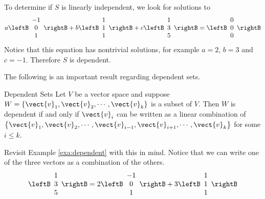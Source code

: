 \begin{solution}
To determine if $S$ is linearly independent, we look for solutions to
\[ 
a\leftB\begin{array}{c} -1 \\ 0 \\ 1 \end{array}\rightB
+b\leftB\begin{array}{c} 1 \\ 1 \\ 1 \end{array}\rightB
+c\leftB\begin{array}{c} 1 \\ 3 \\ 5 \end{array}\rightB
=\leftB\begin{array}{c} 0 \\ 0 \\ 0 \end{array}\rightB
\]
Notice that this equation has nontrivial solutions, 
for example $a=2$, $b=3$ and $c=-1$. Therefore $S$ is dependent. 
\end{solution}

The following is an important result regarding dependent sets.

\begin{lemma}{Dependent Sets}\label{lem:dependent}
Let $V$ be a vector space and suppose $W = \left\{ \vect{v}_1, \vect{v}_2, \cdots, \vect{v}_k \right\}$ is a subset of $V$. Then $W$ is dependent if and only if $\vect{v}_i$ can be written as a linear combination of $\left\{ \vect{v}_1, \vect{v}_2, \cdots, \vect{v}_{i-1}, \vect{v}_{i+1}, \cdots,  \vect{v}_k \right\}$ for some $i \leq k$. 
\end{lemma}

Revisit Example \ref{exa:dependent} with this in mind. Notice that we can write one of the three vectors as a combination of the others.
\[
\leftB\begin{array}{c} 1 \\ 3 \\ 5 \end{array}\rightB
=
2\leftB\begin{array}{c} -1 \\ 0 \\ 1 \end{array}\rightB
+3\leftB\begin{array}{c} 1 \\ 1 \\ 1 \end{array}\rightB
\]

